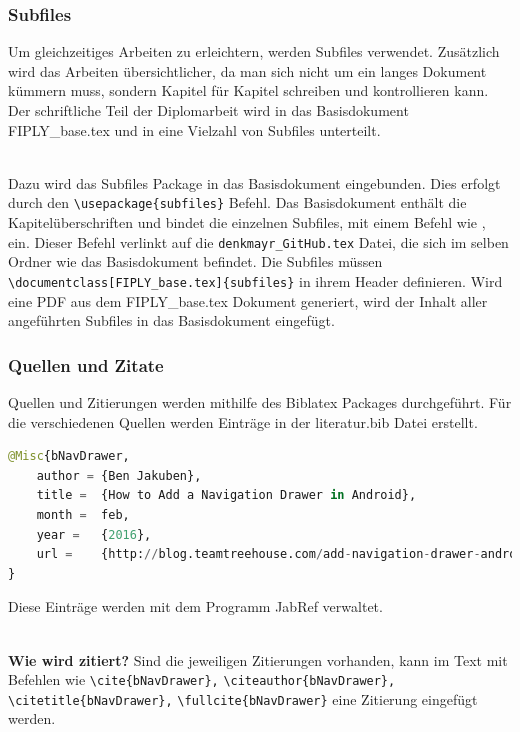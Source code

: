 \documentclass[FIPLY_base.tex]{subfiles}
\begin{document}
\subsubsection{Subfiles}
Um gleichzeitiges Arbeiten zu erleichtern, werden Subfiles verwendet.
Zusätzlich wird das Arbeiten übersichtlicher, da man sich nicht um ein langes Dokument kümmern muss, sondern Kapitel für Kapitel schreiben und kontrollieren kann.
Der schriftliche Teil der Diplomarbeit wird in das Basisdokument FIPLY\_base.tex und in eine Vielzahl von Subfiles unterteilt.

\ \\
Dazu wird das Subfiles Package in das Basisdokument eingebunden.
Dies erfolgt durch den \verb!\usepackage{subfiles}! Befehl.
Das Basisdokument enthält die Kapitelüberschriften und bindet die einzelnen Subfiles, mit einem Befehl wie \verb!!, ein.
Dieser Befehl verlinkt auf die \verb!denkmayr_GitHub.tex! Datei, die sich im selben Ordner wie das Basisdokument befindet.
Die Subfiles müssen \verb!\documentclass[FIPLY_base.tex]{subfiles}! in ihrem Header definieren.
Wird eine PDF aus dem FIPLY\_base.tex Dokument generiert, wird der Inhalt aller angeführten Subfiles in das Basisdokument eingefügt.

\newpage
\subsubsection{Quellen und Zitate}
Quellen und Zitierungen werden mithilfe des Biblatex Packages durchgeführt.
Für die verschiedenen Quellen werden Einträge in der literatur.bib Datei erstellt.

\begin{lstlisting}[language=Python,frame=none, caption={Eintrag in die literatur.bib Datei},label=DescriptiveLabel]
@Misc{bNavDrawer,
	author = {Ben Jakuben},
	title =  {How to Add a Navigation Drawer in Android},
	month =  feb,
	year =   {2016},
	url =    {http://blog.teamtreehouse.com/add-navigation-drawer-android}
}
\end{lstlisting}
Diese Einträge werden mit dem Programm JabRef verwaltet.

\ \\
\textbf{Wie wird zitiert?} \newline
Sind die jeweiligen Zitierungen vorhanden, kann im Text mit Befehlen wie 
\verb!\cite{bNavDrawer},! \newline 
\verb!\citeauthor{bNavDrawer},! \newline 
\verb!\citetitle{bNavDrawer},! \newline
\verb!\fullcite{bNavDrawer}! \newline
eine Zitierung eingefügt werden. 
\end{document}
